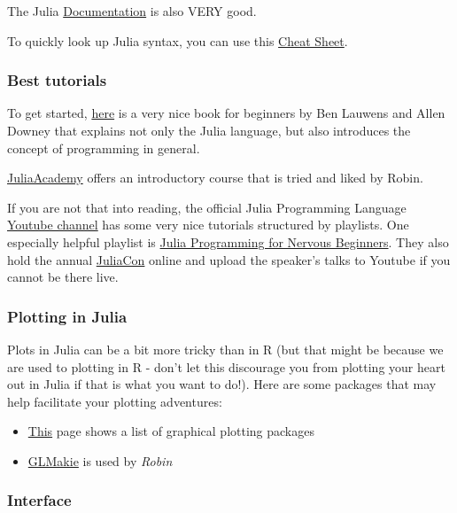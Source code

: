 \documentclass[
]{book}
\begin{document}
The Julia \href{https://docs.julialang.org/en/v1/}{Documentation} is also
VERY good.

To quickly look up Julia syntax, you can use this \href{https://juliadocs.github.io/Julia-Cheat-Sheet/}{Cheat
Sheet}.

\subsubsection{Best tutorials}\label{best-tutorials}

To get started,
\href{https://benlauwens.github.io/ThinkJulia.jl/latest/book.html}{here} is a
very nice book for beginners by Ben Lauwens and Allen Downey that
explains not only the Julia language, but also introduces the concept of
programming in general.

\href{https://juliaacademy.com/courses}{JuliaAcademy} offers an introductory
course that is tried and liked by Robin.

If you are not that into reading, the official Julia Programming
Language \href{https://www.youtube.com/channel/UC9IuUwwE2xdjQUT_LMLONoA}{Youtube
channel} has
some very nice tutorials structured by playlists. One especially helpful
playlist is \href{https://www.youtube.com/watch?v=ub3tqCWZmo4&list=PLP8iPy9hna6Qpx0MgGyElJ5qFlaIXYf1R}{Julia Programming for Nervous
Beginners}.
They also hold the annual \href{https://juliacon.org/2022/}{JuliaCon} online
and upload the speaker's talks to Youtube if you cannot be there live.

\subsubsection{Plotting in Julia}\label{plotting-in-julia}

Plots in Julia can be a bit more tricky than in R (but that might be
because we are used to plotting in R - don't let this discourage you
from plotting your heart out in Julia if that is what you want to do!).
Here are some packages that may help facilitate your plotting
adventures:

\begin{itemize}
\item
  \href{https://juliapackages.com/c/graphical-plotting}{This} page shows a
  list of graphical plotting packages
\item
  \href{https://makie.juliaplots.org/stable/}{GLMakie} is used by \emph{Robin}
\end{itemize}

\subsubsection{Interface}\label{interface-1}
\end{document}
